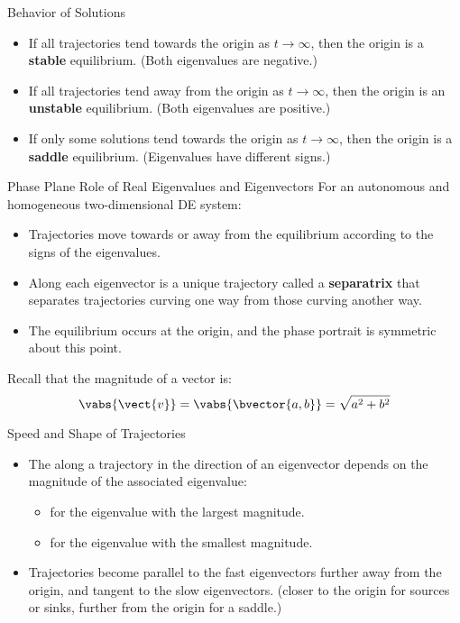 \documentclass{beamer}
\begin{document}
\begin{frame}
\begin{block}{Behavior of Solutions}
\begin{itemize}[<+- | alert@+>]
\item If all trajectories tend towards the origin as $t\rightarrow\infty$, then the origin is a \textbf{stable} equilibrium. (Both eigenvalues are negative.)
\item If all trajectories tend away from the origin as $t\rightarrow\infty$, then the origin is an \textbf{unstable} equilibrium. (Both eigenvalues are positive.)
\item If only some solutions tend towards the origin as $t\rightarrow\infty$, then the origin is a \textbf{saddle} equilibrium. (Eigenvalues have different signs.)
\end{itemize}
\end{block}
\onslide<+->
\begin{block}{Phase Plane Role of Real Eigenvalues and Eigenvectors}
For an autonomous and homogeneous two-dimensional DE system:
\begin{itemize}[<+- | alert@+>]
\item Trajectories move towards or away from the equilibrium according to the signs of the eigenvalues.
\item Along each eigenvector is a unique trajectory called a \textbf{separatrix} that separates trajectories curving one way from those curving another way.
\item The equilibrium occurs at the origin, and the phase portrait is symmetric about this point.
\end{itemize}
\end{block}
\end{frame}

\begin{frame}
\onslide<+->
\begin{block}{}
Recall that the magnitude of a vector is:
\begin{equation*}
\vabs{\vect{v}}=\vabs{\bvector{a,b}}=\sqrt{a^2+b^2}
\end{equation*}
\end{block}
\onslide<+->
\begin{block}{Speed and Shape of Trajectories}
\begin{itemize}[<+- | alert@+>]
\item The  along a trajectory in the direction of an eigenvector depends on the magnitude of the associated eigenvalue:
\begin{itemize}
\item {} for the eigenvalue with the largest magnitude.
\item {} for the eigenvalue with the smallest magnitude.
\end{itemize}
\item Trajectories become parallel to the fast eigenvectors further away from the origin, and tangent to the slow eigenvectors. (closer to the origin for sources or sinks, further from the origin for a saddle.)
\end{itemize}
\end{block}
\end{frame}
\end{document}
